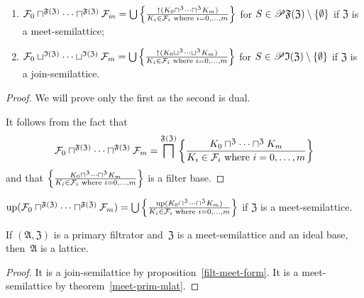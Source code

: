 \begin{thm}
~
\begin{enumerate}
\item $\mathcal{F}_{0}\sqcap^{\mathfrak{F}(\mathfrak{Z})}\dots\sqcap^{\mathfrak{F}(\mathfrak{Z})}\mathcal{F}_{m}=\bigcup\left\{ \frac{\uparrow(K_{0}\sqcap^{\mathfrak{Z}}\dots\sqcap^{\mathfrak{Z}}K_{m})}{K_{i}\in\mathcal{F}_{i}\text{ where }i=0,\dots,m}\right\}$
for $S\in\mathscr{P}\mathfrak{F}(\mathfrak{Z})\setminus\{\emptyset\}$
if $\mathfrak{Z}$ is a meet-semilattice;
\item $\mathcal{F}_{0}\sqcup^{\mathfrak{I}(\mathfrak{Z})}\dots\sqcup^{\mathfrak{I}(\mathfrak{Z})}\mathcal{F}_{m}=\bigcup\left\{ \frac{\uparrow(K_{0}\sqcup^{\mathfrak{Z}}\dots\sqcup^{\mathfrak{Z}}K_{m})}{K_{i}\in\mathcal{F}_{i}\text{ where }i=0,\dots,m}\right\}$
for $S\in\mathscr{P}\mathfrak{I}(\mathfrak{Z})\setminus\{\emptyset\}$
if $\mathfrak{Z}$ is a join-semilattice.
\end{enumerate}
\end{thm}
\begin{proof}
We will prove only the first as the second is dual.

It follows from the fact that
\[
\mathcal{F}_{0}\sqcap^{\mathfrak{F}(\mathfrak{Z})}\dots\sqcap^{\mathfrak{F}(\mathfrak{Z})}\mathcal{F}_{m}=
\bigsqcap^{\mathfrak{F}(\mathfrak{Z})}\left\{ \frac{K_{0}\sqcap^{\mathfrak{Z}}\dots\sqcap^{\mathfrak{Z}}K_{m}}{K_{i}\in\mathcal{F}_{i}\text{ where }i=0,\dots,m}\right\}
\]
and that $\left\{ \frac{K_{0}\sqcap^{\mathfrak{Z}}\dots\sqcap^{\mathfrak{Z}}K_{m}}{K_{i}\in\mathcal{F}_{i}\text{ where }i=0,\dots,m}\right\}$
is a filter base.\end{proof}
\begin{cor}
$\operatorname{up}(\mathcal{F}_{0}\sqcap^{\mathfrak{F}(\mathfrak{Z})}\dots\sqcap^{\mathfrak{F}(\mathfrak{Z})}\mathcal{F}_{m})=\bigcup\left\{ \frac{\operatorname{up}(K_{0}\sqcap^{\mathfrak{Z}}\dots\sqcap^{\mathfrak{Z}}K_{m})}{K_{i}\in\mathcal{F}_{i}\text{ where }i=0,\dots,m}\right\}$
if $\mathfrak{Z}$ is a meet-semilattice.
\end{cor}

\begin{lem}
If $(\mathfrak{A},\mathfrak{Z})$ is a primary filtrator
and~$\mathfrak{Z}$ is a meet-semilattice and an ideal base,
then~$\mathfrak{A}$ is a lattice.
\end{lem}

\begin{proof}
It is a join-semilattice by proposition~\ref{filt-meet-form}. It is a meet-semilattice by theorem~\ref{meet-prim-mlat}.
\end{proof}

